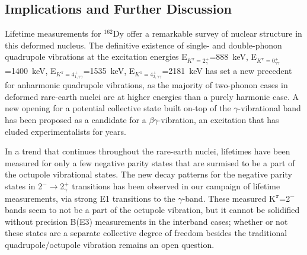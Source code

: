 \subsection{Implications and Further Discussion}
Lifetime measurements for $^{162}$Dy offer a remarkable survey of nuclear structure in this deformed nucleus. The definitive existence of single- and double-phonon quadrupole vibrations at the excitation energies E$_{K^\pi=2^+_\gamma}$=888~keV, E$_{K^\pi=0^+_{\gamma\gamma}}$=1400~keV, E$_{K^\pi=4^+_{1,\gamma\gamma}}$=1535~keV, E$_{K^\pi=4^+_{2,\gamma\gamma}}$=2181~keV has set a new precedent for anharmonic quadrupole vibrations, as the majority of two-phonon cases in deformed rare-earth nuclei are at higher energies than a purely harmonic case. A new opening for a potential collective state built on-top of the $\gamma$-vibrational band has been proposed as a candidate for a $\beta\gamma$-vibration, an excitation that has eluded experimentalists for years.

In a trend that continues throughout the rare-earth nuclei, lifetimes have been measured for only a few negative parity states that are surmised to be a part of the octupole vibrational states. The new decay patterns for the negative parity states in 2$^-\rightarrow$2$^+_\gamma$ transitions has been observed in our campaign of lifetime measurements, via strong E1 transitions to the $\gamma$-band. These measured K$^\pi$=2$^-$ bands seem to not be a part of the octupole vibration, but it cannot be solidified without precision B(E3) measurements in the interband cases; whether or not these states are a separate collective degree of freedom besides the traditional quadrupole/octupole vibration remains an open question.


